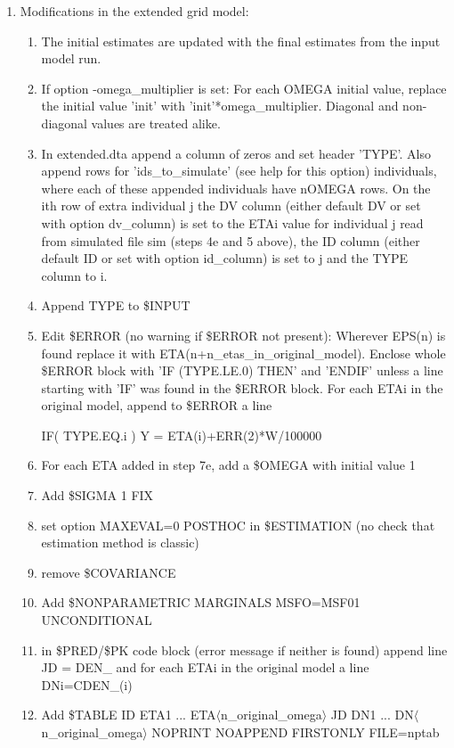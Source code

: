 \begin{enumerate}
		\item Modifications in the extended grid model:
		\begin{enumerate} 
			\item The initial estimates are updated with the final estimates from the input model run.
			\item If option -omega\_multiplier is set: For each OMEGA initial value, replace the initial value 'init' with 'init'*omega\_multiplier. Diagonal and non-diagonal values are treated alike. 
			\item In extended.dta append a column of zeros and set header 'TYPE'. Also append rows for 'ids\_to\_simulate' (see help for this option) individuals, where each of these appended individuals have nOMEGA rows. On the ith row of extra individual j the DV column (either default DV or set with option dv\_column) is set to the ETAi value for individual j read from simulated file sim (steps 4e and 5 above), the ID column (either default ID or set with option id\_column) is set to j and the TYPE column to i.     
																																			
																															 
																																				  
																											
			\item Append TYPE to \$INPUT
			\item Edit \$ERROR (no warning if \$ERROR not present): Wherever EPS(n) is found replace it with ETA(n+n\_etas\_in\_original\_model). Enclose whole \$ERROR block with 'IF (TYPE.LE.0) THEN' and 'ENDIF' unless a line starting with 'IF' was found in the \$ERROR block. For each ETAi in the original model, append to \$ERROR a line
																																	  
															   
			IF( TYPE.EQ.i ) Y = ETA(i)+ERR(2)*W/100000
			\item For each ETA added in step 7e, add a \$OMEGA with initial value 1
			\item Add \$SIGMA 1 FIX
			\item set option MAXEVAL=0 POSTHOC in \$ESTIMATION (no check that estimation method is classic)
			\item remove \$COVARIANCE
			\item Add \$NONPARAMETRIC MARGINALS MSFO=MSF01 UNCONDITIONAL
			\item in \$PRED/\$PK code block (error message if neither is found) append line
			JD = DEN\_
			and for each ETAi in the original model a line  
			DNi=CDEN\_(i)
			\item Add \$TABLE ID ETA1 ... ETA$\langle$n\_original\_omega$\rangle$ JD DN1 ... DN$\langle$n\_original\_omega$\rangle$ NOPRINT NOAPPEND FIRSTONLY FILE=nptab
							   

\end{enumerate}
\end{enumerate}
